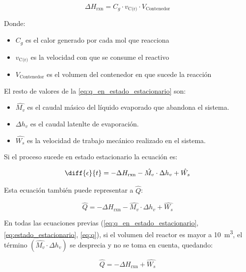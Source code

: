 \documentclass{AsignaturaResumen}
\begin{document}
\begin{equation}
    \Delta H_{\mathrm{rxn}} = C_{g} \cdot v_{\text{C(r)}} \cdot V_{\text{Contenedor}}
\end{equation}

Donde:

\begin{itemize}
    \item $C_{g}$ es el calor generado por cada mol que reacciona
    \item $v_{\text{C(r)}}$ es la velocidad con que se consume el reactivo
    \item $V_{\text{Contenedor}}$ es el volumen del contenedor en que sucede la reacción
\end{itemize}

El resto de valores de la \autoref{eq:q_en_estado_estacionario} son:

\begin{itemize}
    \item $\hat{M_{v}}$ es el caudal másico del líquido evaporado que abandona el sistema.
    \item $\Delta h_{v}$ es el caudal latenlte de evaporación.
    \item $\hat{W_{s}}$ es la velocidad de trabajo mecánico realizado en el sistema.
\end{itemize}

Si el proceso sucede en estado estacionario la ecuación es:

\begin{equation}\label{eq:estado_estacionario}
    \diff{\epsilon}{t} = -\Delta H_{\mathrm{rxn}} - \hat{M_{v}} \cdot \Delta h_{v} + \hat{W_{s}}
\end{equation}

Esta ecuación también puede representar a $\hat{Q}$:

\begin{equation}\label{eq:q}
    \hat{Q} = -\Delta H_{\mathrm{rxn}} - \hat{M_{v}} \cdot \Delta h_{v} + \hat{W_{s}}
\end{equation}

En todas las ecuaciones previas (\ref{eq:q_en_estado_estacionario}, \ref{eq:estado_estacionario}, \ref{eq:q}), si el volumen del reactor es mayor a \qty{10}{\m\cubed}, el término $(\hat{M_{v}} \cdot \Delta h_{v})$ se desprecia y no se toma en cuenta, quedando:

\begin{equation}\label{eq:q_en_reactores_grandes}
    \hat{Q} = -\Delta H_{\mathrm{rxn}} + \hat{W_{s}}
\end{equation}
\end{document}
